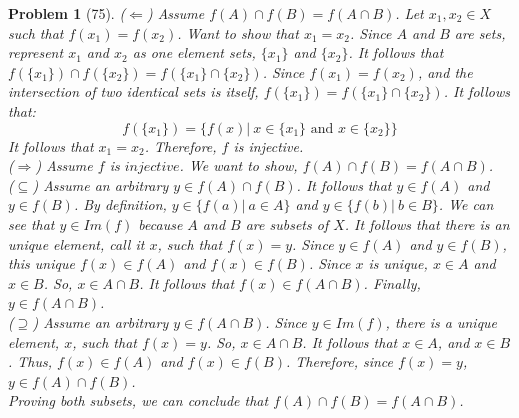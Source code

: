 \documentclass{article}
\theoremstyle{problem}
\newtheorem{prob}{Problem}
\theoremstyle{plain}
\theoremstyle{remark}
\begin{document}
\begin{prob}[75]
($\Leftarrow$) Assume $f(A) \cap f(B) = f(A \cap B)$. Let $x_1, x_2 \in X$ such that $f(x_1) = f(x_2)$. Want to show that $x_1 = x_2$. Since $A$ and $B$ are sets, represent $x_1$ and $x_2$ as one element sets, $\{x_1\}$ and $\{x_2\}$. It follows that $f(\{x_1\}) \cap f(\{x_2\}) = f(\{x_1\} \cap \{x_2\})$. Since $f(x_1) = f(x_2)$, and the intersection of two identical sets is itself, $f(\{x_1\}) = f(\{x_1\} \cap \{x_2\})$. It follows that:
$$
  f(\{x_1\}) = \{f(x)|\ x \in \{x_1\} \text{ and } x \in \{x_2\}\}  
$$
It follows that $x_1 = x_2$. Therefore, $f$ is injective.\\
($\Rightarrow$) 
Assume $f$ is $injective$. 
We want to show, $f(A) \cap f(B) = f(A \cap B)$.\\
($\subseteq$)
Assume an arbitrary $y \in f(A) \cap f(B)$. 
It follows that $y \in f(A)$ and $y \in f(B)$. 
By definition, $y \in \{f(a)|\ a \in A\}$ and $y \in \{f(b)|\ b \in B\}$. 
We can see that $y \in Im(f)$ because $A$ and $B$ are subsets of $X$.
It follows that there is an unique element, call it $x$, such that $f(x) = y$.
Since $y \in f(A)$ and $y \in f(B)$, this unique $f(x) \in f(A)$ and $f(x) \in f(B)$.
Since $x$ is unique, $x \in A$ and $x \in B$.
So, $x \in A \cap B$.
It follows that $f(x) \in f(A \cap B)$.
Finally, $y \in f(A \cap B)$.\\
($\supseteq$) Assume an arbitrary $y \in f(A \cap B)$. Since $y \in Im(f)$, there is a unique element, $x$, such that $f(x) = y$. So, $x \in A \cap B$. It follows that $x \in A$, and $x \in B$. Thus, $f(x) \in f(A)$ and $f(x) \in f(B)$. Therefore, since $f(x) = y$, $y \in f(A) \cap f(B)$.\\
Proving both subsets, we can conclude that $f(A) \cap f(B) = f(A \cap B)$.
\end{prob}
\end{document}
